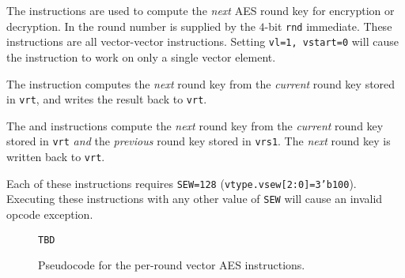 The  instructions
are used to compute the {\em next} AES round key for encryption
or decryption.
In the round number is supplied by the $4$-bit {\tt rnd} immediate.
These instructions are all vector-vector instructions.
Setting {\tt vl=1, vstart=0} will cause the instruction to work on only a
single vector element.

The  instruction computes
the {\em next} round key
from the
{\em current} round key
stored in {\tt vrt},
and writes the result back to {\tt vrt}.

The  and  instructions
compute the {\em next} round key
from the
{\em current} round key stored in {\tt vrt}
{\em and}
the {\em previous} round key stored in {\tt vrs1}.
The {\em next} round key is written back to {\tt vrt}.

Each of these instructions requires {\tt SEW=128}
({\tt vtype.vsew[2:0]=3'b100}).
Executing these instructions with any other value of {\tt SEW} will cause
an invalid opcode exception.

%
%
%
%
%
%
%
%
%
%
%
%
%

\begin{figure}[h]
\begin{lstlisting}[language=pseudo]
TBD
\end{lstlisting}
\caption{Pseudocode for the per-round vector AES instructions.}
\label{fig:pseudo:aes:vector:per-round}
\end{figure}


